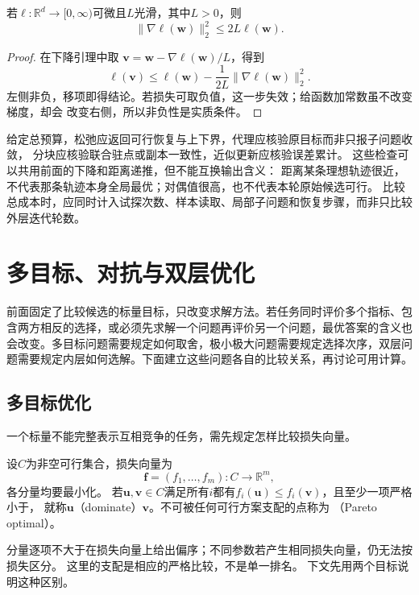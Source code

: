 \begin{lemma}[非负光滑函数的梯度自界]
\label{lem:opt-self-bounding}
若$\ell:\mathbb{R}^d\to[0,\infty)$可微且$L$光滑，其中$L>0$，则
\[
  \lVert\nabla\ell(\bm{w})\rVert_2^2\leq2L\ell(\bm{w}).
\]
\end{lemma}

\begin{proof}
在下降引理中取
$\bm{v}=\bm{w}-\nabla\ell(\bm{w})/L$，得到
\[
  \ell(\bm{v})
  \leq\ell(\bm{w})-\frac{1}{2L}
  \lVert\nabla\ell(\bm{w})\rVert_2^2.
\]
左侧非负，移项即得结论。若损失可取负值，这一步失效；给函数加常数虽不改变梯度，却会
改变右侧，所以非负性是实质条件。
\end{proof}

给定总预算，松弛应返回可行恢复与上下界，代理应核验原目标而非只报子问题收敛，
分块应核验联合驻点或副本一致性，近似更新应核验误差累计。
这些检查可以共用前面的下降和距离递推，但不能互换输出含义：
距离某条理想轨迹很近，不代表那条轨迹本身全局最优；对偶值很高，也不代表本轮原始候选可行。
比较总成本时，应同时计入试探次数、样本读取、局部子问题和恢复步骤，而非只比较外层迭代轮数。

\section{多目标、对抗与双层优化}
\label{sec:opt-decomposition-multiple-levels}

前面固定了比较候选的标量目标，只改变求解方法。若任务同时评价多个指标、包含两方相反的选择，或必须先求解一个问题再评价另一个问题，最优答案的含义也会改变。多目标问题需要规定如何取舍，极小极大问题需要规定选择次序，双层问题需要规定内层如何选解。下面建立这些问题各自的比较关系，再讨论可用计算。

\subsection{多目标优化}
\label{sec:opt-multiobjective-saddle}

一个标量不能完整表示互相竞争的任务，需先规定怎样比较损失向量。
\begin{definition}[支配与Pareto最优]
\label{def:opt-pareto-optimality}
设$C$为非空可行集合，损失向量为
\[
 \bm f=(f_1,\ldots,f_m):C\to\mathbb R^m,
\]
各分量均要最小化。
若$\bm u,\bm v\in C$满足所有$i$都有$f_i(\bm u)\leq f_i(\bm v)$，且至少一项严格小于，
就称$\bm u$（dominate）$\bm v$。不可被任何可行方案支配的点称为
（Pareto optimal）。
\end{definition}
分量逐项不大于在损失向量上给出偏序；不同参数若产生相同损失向量，仍无法按损失区分。
这里的支配是相应的严格比较，不是单一排名。
下文先用两个目标说明这种区别。

